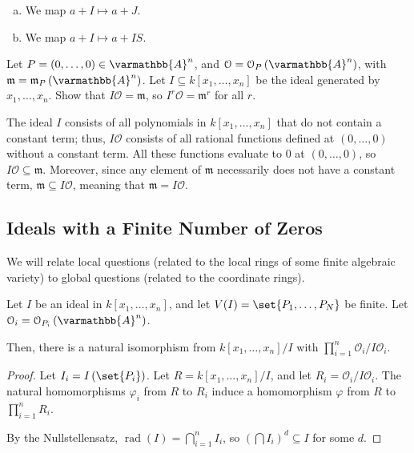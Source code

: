 \documentclass[10pt]{mypackage}
\renewcommand*{\mathbb}[1]{\varmathbb{#1}}
\newcommand{\A}{\mathbb{A}}
\begin{document}
\begin{solution}\hfill
  \begin{enumerate}[(a)]
    \item We map $a + I \mapsto a + J$.
    \item We map $a + I \mapsto a + IS$.
  \end{enumerate}
\end{solution}
\begin{exercise}[Exercise 2.43]
  Let $P = \left( 0,\dots,0 \right)\in \A^n$, and $\mathcal{O} = \mathcal{O}_P\left( \A^n \right)$, with $\mathfrak{m} = \mathfrak{m}_P\left(\A^n\right)$. Let $I\subseteq k\left[ x_1,\dots,x_n \right]$ be the ideal generated by $x_1,\dots,x_n$. Show that $I\mathcal{O} = \mathfrak{m}$, so $I^{r}\mathcal{O} = \mathfrak{m}^{r}$ for all $r$.
\end{exercise}
\begin{solution}
  The ideal $I$ consists of all polynomials in $k\left[ x_1,\dots,x_n \right]$ that do not contain a constant term; thus, $I\mathcal{O}$ consists of all rational functions defined at $\left( 0,\dots,0 \right)$ without a constant term. All these functions evaluate to $0$ at $\left( 0,\dots,0 \right)$, so $I\mathcal{O}\subseteq \mathfrak{m}$. Moreover, since any element of $\mathfrak{m}$ necessarily does not have a constant term, $\mathfrak{m}\subseteq I\mathcal{O}$, meaning that $\mathfrak{m} = I\mathcal{O}$.
\end{solution}
\subsection{Ideals with a Finite Number of Zeros}%
We will relate local questions (related to the local rings of some finite algebraic variety) to global questions (related to the coordinate rings).
\begin{proposition}
  Let $I$ be an ideal in $k\left[ x_1,\dots,x_n \right]$, and let $V(I) = \set{P_1,\dots,P_N}$ be finite. Let $\mathcal{O}_i = \mathcal{O}_{P_i}\left( \A^n \right)$.\newline

  Then, there is a natural isomorphism from $k\left[ x_1,\dots,x_n \right]/I$ with $\prod_{i=1}^{n}\mathcal{O}_i/I\mathcal{O}_i$.
\end{proposition}
\begin{proof}
  Let $I_i = I\left( \set{P_i} \right)$. Let $R = k\left[ x_1,\dots,x_n \right]/I$, and let $R_i = \mathcal{O}_i/I\mathcal{O}_i$. The natural homomorphisms $\varphi_i$ from $R$ to $R_i$ induce a homomorphism $\varphi$ from $R$ to $\prod_{i=1}^{n}R_i$.\newline

  By the Nullstellensatz, $\operatorname{rad}\left( I \right) = \bigcap_{i=1}^{n}I_i$, so $\left( \bigcap I_i \right)^d\subseteq I$ for some $d$.
\end{proof}
\end{document}
